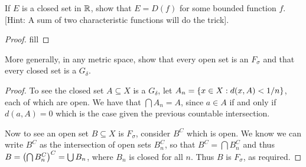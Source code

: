 \begin{exercise}{9}
If $E$ is a closed set in $\mathbb{R}$, show that $E=D(f)$ for some bounded function $f$.
[Hint: A sum of two characteristic functions will do the trick].
\end{exercise}
\begin{proof}
fill
\end{proof} 

\begin{exercise}{12}
More generally, in any metric space, show that every open set is an $F_\sigma$ and that every closed set is a $G_\delta$.
\end{exercise}
\begin{proof}
To see the closed set $A\subseteq X$ is a $G_\delta$, let $A_n=\{x\in X: d(x,A)<1/n\}$, each of which are open.
We have that $\bigcap A_n = A$, since $a\in A$ if and only if $d(a,A)=0$ which is the case given the previous countable intersection.

Now to see an open set $B\subseteq X$ is $F_\sigma$, consider $B^C$ which is open.
We know we can write $B^C$ as the intersection of open sets $B_n^C$, so that $B^C = \bigcap B_n^C$ and thus $B = \left( \bigcap B_n^C\right)^C = \bigcup B_n$, where $B_n$ is closed for all $n$. 
Thus $B$ is $F_\sigma$, as required.
\end{proof} 

